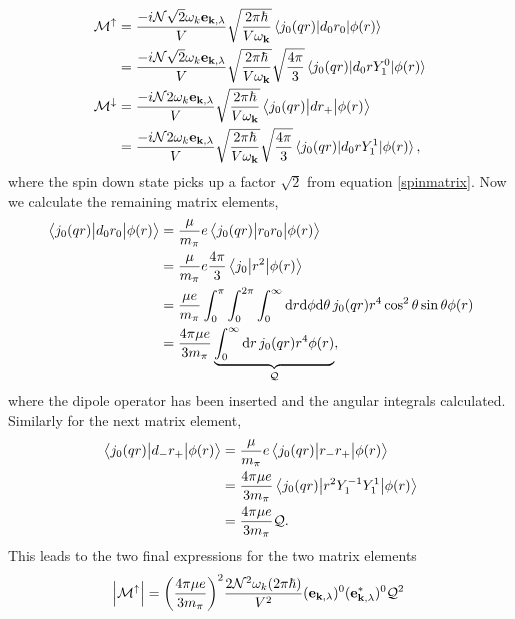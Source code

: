 \begin{align}
    \mathcal{M}^{\uparrow} &=\frac{-i\mathcal{N}\sqrt{2}\omega_k\bm{\mathrm{e}}_{\bm{\mathrm{k}},\lambda}}{V}\sqrt{\frac{2\pi\hbar}{V\omega_{\bm{\mathrm{k}}}}}\mel*{j_0(qr)}{d_0 r_0}{\phi(r)}  \\
    &= \frac{-i\mathcal{N}\sqrt{2}\omega_k\bm{\mathrm{e}}_{\bm{\mathrm{k}},\lambda}}{V}\sqrt{\frac{2\pi\hbar}{V\omega_{\bm{\mathrm{k}}}}}\sqrt{\frac{4\pi}{3}}\mel*{j_0(qr)}{d_0 r Y_1^0}{\phi(r)} \\
    \mathcal{M}^{\downarrow} & = \frac{-i\mathcal{N}2\omega_k\bm{\mathrm{e}}_{\bm{\mathrm{k}},\lambda}}{V}\sqrt{\frac{2\pi\hbar}{V\omega_{\bm{\mathrm{k}}}}} \mel{j_0(qr)}{d r_{+}}{\phi(r)}\\
    &=\frac{-i\mathcal{N}2\omega_k\bm{\mathrm{e}}_{\bm{\mathrm{k}},\lambda}}{V}\sqrt{\frac{2\pi\hbar}{V\omega_{\bm{\mathrm{k}}}}}\sqrt{\frac{4\pi}{3}}\mel*{j_0(qr)}{d_0 r Y_1^1}{\phi(r)}, \\
\end{align}
where the spin down state picks up a factor $\sqrt{2}$ from equation \ref{spinmatrix}. Now we calculate the remaining matrix elements,
\begin{align}
    \mel{j_0(qr)}{d_0 r_0}{\phi(r)} &= \frac{\mu}{m_\pi}e \mel{j_0(qr)}{r_0r_0}{\phi(r)} \\
    &= \frac{\mu}{m_\pi}e\frac{4\pi}{3} \mel{j_0}{r^2}{\phi(r)} \\
    &= \frac{\mu e }{m_\pi} \int_0^\pi \int_0^{2\pi} \int_0^\infty \text{d}r \text{d}\phi \text{d}\theta \, j_0(qr)r^4\cos^2\theta \sin\theta \phi(r) \\
    &= \frac{4\pi \mu e}{3m_\pi} \underbrace{\int_0^\infty \text{d}r \, j_0(qr)r^4\phi(r)}_{\mathcal{Q}},
\end{align}
where the dipole operator has been inserted and the angular integrals calculated. Similarly for the next matrix element,
\begin{align}
    \mel{j_0(qr)}{d_{-}r_{+}}{\phi(r)} &= \frac{\mu}{m_\pi}e \mel{j_0(qr)}{r_{-}r_{+}}{\phi(r)} \\
    &= \frac{4\pi \mu e}{3 m_\pi} \mel{j_0(qr)}{r^2 Y_1^{-1}Y_1^1}{\phi(r)} \\
    &= \frac{4\pi \mu e}{3 m_\pi} \mathcal{Q}. 
\end{align}
This leads to the two final expressions for the two matrix elements
\begin{equation}
    \abs{\mathcal{M}^\uparrow} = \bigg( \frac{4\pi \mu e}{3m_\pi}\bigg)^2 \frac{2 \mathcal{N}^2\omega_k (2\pi \hbar)}{V^2}(\bm{\mathrm{e}}_{\bm{\mathrm{k}},\lambda})^0(\bm{\mathrm{e}}_{\bm{\mathrm{k}},\lambda}^*)^0 \mathcal{Q}^2 
\end{equation}
